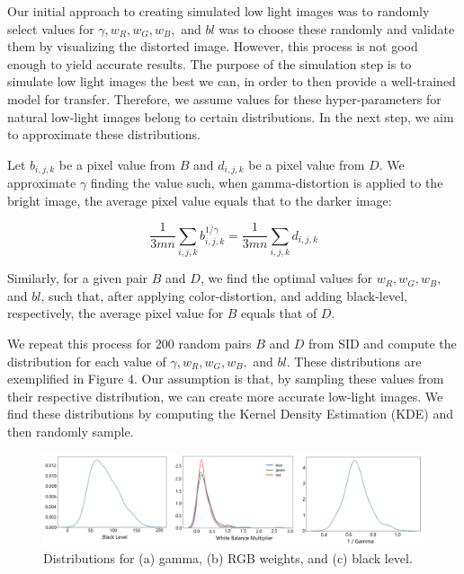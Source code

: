 \documentclass{article}
\begin{document}
Our initial approach to creating simulated low light images was to randomly select values for \(\gamma, w_{R}, w_{G}, w_{B},\) and \(bl\) was to choose these randomly and validate them by visualizing the distorted image. However, this process is not good enough to yield accurate results. The purpose of the simulation step is to simulate low light images the best we can, in order to then provide a well-trained model for transfer. Therefore, we assume values for these hyper-parameters for natural low-light images belong to certain distributions. In the next step, we aim to approximate these distributions.  \newline

Let \(b_{i,j,k}\) be a pixel value from \(B\) and \(d_{i,j,k}\) be a pixel value from \(D\). We approximate \(\gamma\) finding the value such, when gamma-distortion is applied to the bright image, the average pixel value equals that to the darker image:

\[  \frac{1}{3mn}\sum_{i,j,k}b_{i,j,k}^
{1/\gamma} = \frac{1}{3mn}\sum_{i,j,k}d_{i,j,k}\] 

Similarly, for a given pair \(B\) and \(D\), we find the optimal values for \(w_{R}, w_{G}, w_{B},\) and \(bl\), such that, after applying color-distortion, and adding black-level, respectively, the average pixel value for \(B\) equals that of \(D\). \newline

We repeat this process for 200 random pairs \(B\) and \(D\) from SID and compute the distribution for each value of \(\gamma, w_{R}, w_{G}, w_{B},\) and \(bl\). These distributions are exemplified in Figure 4. Our assumption is that, by sampling these values from their respective distribution, we can create more accurate low-light images. We find these distributions by computing
the Kernel Density Estimation (KDE) and then randomly sample. 

\begin{figure}[ht]
  \centering
  \includegraphics[scale=0.4]{Distributions}
  \caption{Distributions for (a) gamma, (b) RGB weights, and (c) black level.}
  \label{fig:train2}
\end{figure}
\end{document}
